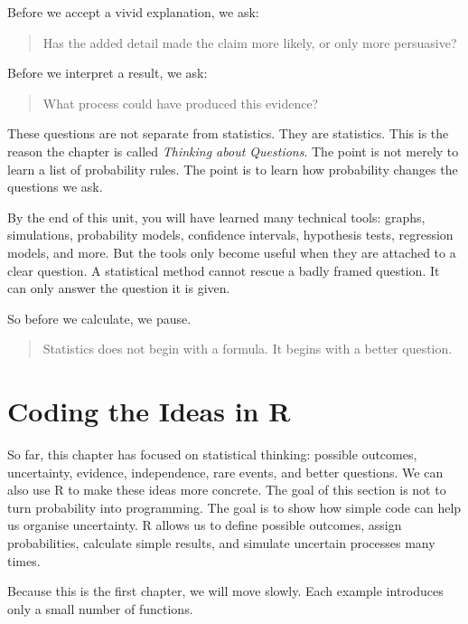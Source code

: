\documentclass[
  letterpaper,
  DIV=11,
  numbers=noendperiod]{scrreprt}
\begin{document}
Before we accept a vivid explanation, we ask:

\begin{quote}
Has the added detail made the claim more likely, or only more
persuasive?
\end{quote}

Before we interpret a result, we ask:

\begin{quote}
What process could have produced this evidence?
\end{quote}

These questions are not separate from statistics. They are statistics.
This is the reason the chapter is called \emph{Thinking about
Questions}. The point is not merely to learn a list of probability
rules. The point is to learn how probability changes the questions we
ask.

By the end of this unit, you will have learned many technical tools:
graphs, simulations, probability models, confidence intervals,
hypothesis tests, regression models, and more. But the tools only become
useful when they are attached to a clear question. A statistical method
cannot rescue a badly framed question. It can only answer the question
it is given.

So before we calculate, we pause.

\begin{quote}
Statistics does not begin with a formula. It begins with a better
question.
\end{quote}

\section{Coding the Ideas in R}\label{coding-the-ideas-in-r}

So far, this chapter has focused on statistical thinking: possible
outcomes, uncertainty, evidence, independence, rare events, and better
questions. We can also use R to make these ideas more concrete. The goal
of this section is not to turn probability into programming. The goal is
to show how simple code can help us organise uncertainty. R allows us to
define possible outcomes, assign probabilities, calculate simple
results, and simulate uncertain processes many times.

Because this is the first chapter, we will move slowly. Each example
introduces only a small number of functions.
\end{document}
